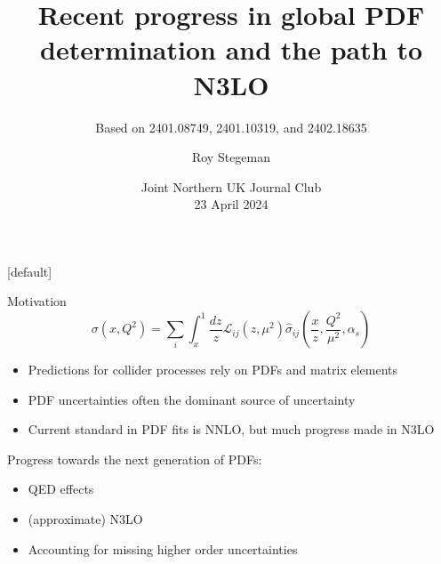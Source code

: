 \documentclass[aspectratio=169, 9pt,t]{beamer}
\title{Recent progress in global PDF determination and the path to N3LO}
\subtitle{Based on 2401.08749, 2401.10319, and 2402.18635 }
\date{Joint Northern UK Journal Club  \\[0.1cm] 23 April 2024}
\author{Roy Stegeman}
\institute{\small The University of Edinburgh}
\begin{document}
{
\begin{frame}
  \titlepage
\end{frame}
}

[default]



\newcommand{\nn}{\vspace*{1em}}





\begin{frame}{Motivation}
  $$\sigma(x,Q^2)=\sum_i \int_x^1 \frac{dz}{z} \mathcal{L}_{ij}(z,\mu^2)\hat{\sigma}_{ij}\left(\frac{x}{z},\frac{Q^2}{\mu^2},\alpha_s\right)$$

  \vspace*{0.5em}
  \begin{itemize}
    \item Predictions for collider processes rely on PDFs and matrix elements
    \item PDF uncertainties often the dominant source of uncertainty
    \item Current standard in PDF fits is NNLO, but much progress made in N3LO
  \end{itemize}

  \vspace*{0.5em}
  Progress towards the next generation of PDFs:
  \begin{itemize}
    \item QED effects
    \item (approximate) N3LO
    \item Accounting for missing higher order uncertainties
  \end{itemize}
\end{frame}


\end{document}
